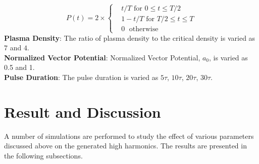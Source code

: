 \documentclass[12pt]{article}
\newenvironment{changemargin}[2]{%
\begin{list}{}{%
\setlength{\topsep}{0pt}%
\setlength{\leftmargin}{#1}%
\setlength{\rightmargin}{#2}%
\setlength{\listparindent}{\parindent}%
\setlength{\itemindent}{\parindent}%
\setlength{\parsep}{\parskip}%
}%
\item[]}{\end{list}}
\begin{document}
\begin{changemargin}{-2cm}{-2cm}
    \begin{equation}\label{triangle-env}
        P(t)= 2\times
        \begin{cases}
             & t/T \text{ for } 0 \leq t \le T/2    \\
             & 1-t/T \text{ for } T/2 \leq t \le T  \\
             & 0         \;      \text{ otherwise }
        \end{cases}
    \end{equation}
    \noindent
    \textbf{Plasma Density}:
    The ratio of plasma density to the critical density is varied as $7$ and $4$.\\
    \noindent
    \textbf{Normalized Vector Potential}:
    Normalized Vector Potential, $a_0$, is varied as 0.5 and 1.\\
    \noindent
    \textbf{Pulse Duration}:
    The pulse duration is varied as $5\tau$, $10\tau$, $20\tau$, $30\tau$.

    \section{Result and Discussion}
    A number of simulations are performed to study the effect of various parameters discussed above on the generated high harmonics. The results are presented in the following subsections.



\end{changemargin}
\end{document}
